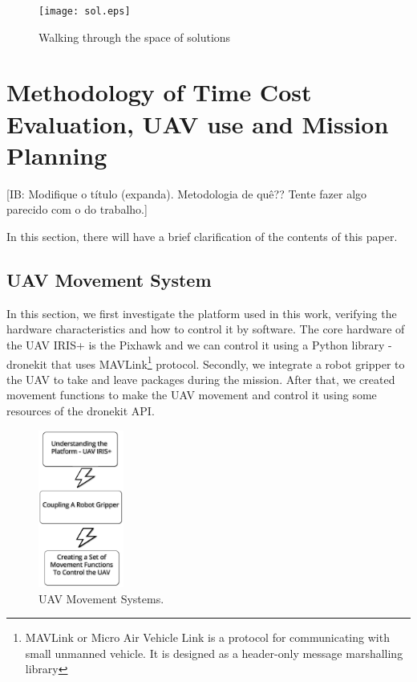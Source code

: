 \documentclass[conference,harvard,brazil,english]{sbatex}
\newcommand{\commentib}[1]{{\color{blue} [IB: #1]}}
\begin{document}
\begin{figure}[H]
	\centering
	\texttt{[image: sol.eps]}
	\caption{Walking through the space of solutions\label{fig:sol}}
\end{figure}

\section{Methodology of Time Cost Evaluation, UAV use and Mission Planning}
\label{sec:method}

\commentib{Modifique o t\'itulo (expanda). Metodologia de qu\^e?? Tente fazer algo parecido com o do trabalho.}

	In this section, there will have a brief clarification of the contents of this paper.
\subsection{UAV Movement System}

In this section, we first investigate the platform used in this work, verifying the hardware characteristics and how to control it by software. The core hardware of the UAV IRIS+ is the Pixhawk and we can control it using a Python library - dronekit that uses MAVLink\footnote{MAVLink or Micro Air Vehicle Link is a protocol for communicating with small unmanned vehicle. It is designed as a header-only message marshalling library} protocol. Secondly, we integrate a robot gripper to the UAV to take and leave packages during the mission. After that, we created movement functions to make the UAV movement and control it using some resources of the dronekit API.
\begin{figure}[H]
	\centering
	\includegraphics[width=0.25\textwidth]{movement.eps}
	\caption{UAV Movement Systems.\label{fig:movement}}
\end{figure}

\end{document}
